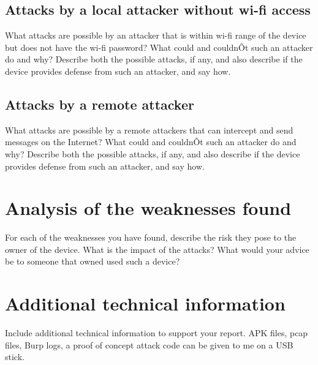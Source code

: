 \documentclass[11pt]{article}
\begin{document}
\subsection{Attacks by a local attacker without wi-fi access}

What attacks are possible by an attacker that is within wi-fi range of the
device but does not have the wi-fi password? What could and couldnÕt such an
attacker do and why? Describe both the possible attacks, if any, and also
describe if the device provides defense from such an attacker, and say how.

\subsection{Attacks by a remote attacker}

What attacks are possible by a remote attackers that can intercept and send
messages on the Internet? What could and couldnÕt such an attacker do and why?
Describe both the possible attacks, if any, and also describe if the device
provides defense from such an attacker, and say how.

\section{Analysis of the weaknesses found}

For each of the weaknesses you have found, describe the risk they pose to the
owner of the device. What is the impact of the attacks? What would your advice
be to someone that owned used such a device?

\appendix

\section{Additional technical information}

Include additional technical information to support your report. APK files,
pcap files, Burp logs, a proof of concept attack code can be given to me on a
USB stick.
\end{document}
